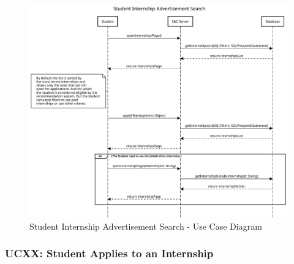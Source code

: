 \begin{figure}[H]
    \centering
    \includegraphics[width=1.0\textwidth]{Images/UC_3.pdf}
    \caption{Student Internship Advertisement Search - Use Case Diagram}
    \label{fig:use-case-diagram-3}
\end{figure}


\subsubsection{UCXX: Student Applies to an Internship}
\label{subsubsec:student-applies-to-an-internship}

